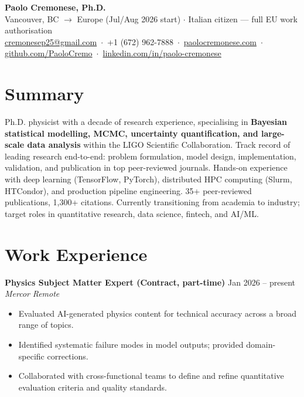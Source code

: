 \documentclass[10pt,a4paper]{article}
\newcommand{\cventry}[4]{%
  {\textbf{#1}} \hfill {\small #2}\\[-3pt]
  {\textit{\small #3}} \hfill {\textit{\small #4}}%
}
\begin{document}
\begin{center}
  {\Large\bfseries Paolo Cremonese, Ph.D.}\\[4pt]
  {\small
    Vancouver, BC $\rightarrow$ Europe (Jul/Aug 2026 start) \quad$\cdot$\quad
    Italian citizen — full EU work authorisation
  }\\[2pt]
  {\small
    \href{mailto:cremonesep25@gmail.com}{cremonesep25@gmail.com}
    \,$\cdot$\,
    +1 (672) 962-7888
    \,$\cdot$\,
    \href{https://paolocremonese.com}{paolocremonese.com}
    \,$\cdot$\,
    \href{https://github.com/PaoloCremo}{github.com/PaoloCremo}
    \,$\cdot$\,
    \href{https://www.linkedin.com/in/paolo-cremonese/}{linkedin.com/in/paolo-cremonese}
  }
\end{center}

\vspace{2pt}

\section{Summary}

Ph.D. physicist with a decade of research experience, specialising in \textbf{Bayesian statistical
modelling, MCMC, uncertainty quantification, and large-scale data analysis} within the LIGO Scientific
Collaboration. Track record of leading research end-to-end: problem formulation, model design,
implementation, validation, and publication in top peer-reviewed journals. Hands-on experience with
deep learning (TensorFlow, PyTorch), distributed HPC computing (Slurm, HTCondor), and production
pipeline engineering. 35+ peer-reviewed publications, 1,300+ citations. Currently transitioning from
academia to industry; target roles in quantitative research, data science, fintech, and AI/ML.

\section{Work Experience}

\cventry{Physics Subject Matter Expert (Contract, part-time)}{Jan 2026 -- present}{Mercor}{Remote}
\begin{itemize}[noitemsep, topsep=3pt, leftmargin=1.2em]
  \item Evaluated AI-generated physics content for technical accuracy across a broad range of topics.
  \item Identified systematic failure modes in model outputs; provided domain-specific corrections.
  \item Collaborated with cross-functional teams to define and refine quantitative evaluation criteria
        and quality standards.
\end{itemize}
\end{document}
